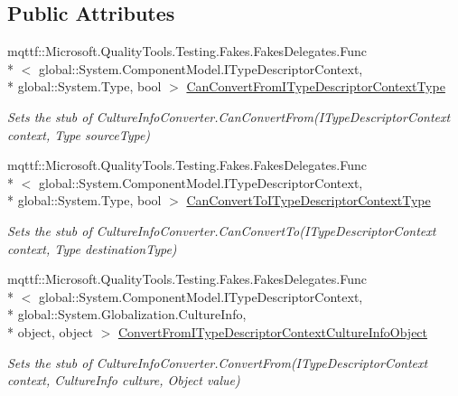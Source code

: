 \subsection*{Public Attributes}
\begin{DoxyCompactItemize}
\item 
mqttf\-::\-Microsoft.\-Quality\-Tools.\-Testing.\-Fakes.\-Fakes\-Delegates.\-Func\\*
$<$ global\-::\-System.\-Component\-Model.\-I\-Type\-Descriptor\-Context, \\*
global\-::\-System.\-Type, bool $>$ \hyperlink{class_system_1_1_component_model_1_1_fakes_1_1_stub_culture_info_converter_af6ea6192a8b946da0dd4f0c9f57b9ed7}{Can\-Convert\-From\-I\-Type\-Descriptor\-Context\-Type}
\begin{DoxyCompactList}\small\item\em Sets the stub of Culture\-Info\-Converter.\-Can\-Convert\-From(\-I\-Type\-Descriptor\-Context context, Type source\-Type)\end{DoxyCompactList}\item 
mqttf\-::\-Microsoft.\-Quality\-Tools.\-Testing.\-Fakes.\-Fakes\-Delegates.\-Func\\*
$<$ global\-::\-System.\-Component\-Model.\-I\-Type\-Descriptor\-Context, \\*
global\-::\-System.\-Type, bool $>$ \hyperlink{class_system_1_1_component_model_1_1_fakes_1_1_stub_culture_info_converter_ae3dfe7aaa7ae017c08b68c51184a6fff}{Can\-Convert\-To\-I\-Type\-Descriptor\-Context\-Type}
\begin{DoxyCompactList}\small\item\em Sets the stub of Culture\-Info\-Converter.\-Can\-Convert\-To(\-I\-Type\-Descriptor\-Context context, Type destination\-Type)\end{DoxyCompactList}\item 
mqttf\-::\-Microsoft.\-Quality\-Tools.\-Testing.\-Fakes.\-Fakes\-Delegates.\-Func\\*
$<$ global\-::\-System.\-Component\-Model.\-I\-Type\-Descriptor\-Context, \\*
global\-::\-System.\-Globalization.\-Culture\-Info, \\*
object, object $>$ \hyperlink{class_system_1_1_component_model_1_1_fakes_1_1_stub_culture_info_converter_aee14caa9558091bce95583cbac173aab}{Convert\-From\-I\-Type\-Descriptor\-Context\-Culture\-Info\-Object}
\begin{DoxyCompactList}\small\item\em Sets the stub of Culture\-Info\-Converter.\-Convert\-From(\-I\-Type\-Descriptor\-Context context, Culture\-Info culture, Object value)\end{DoxyCompactList}\item 

\end{DoxyCompactItemize}
